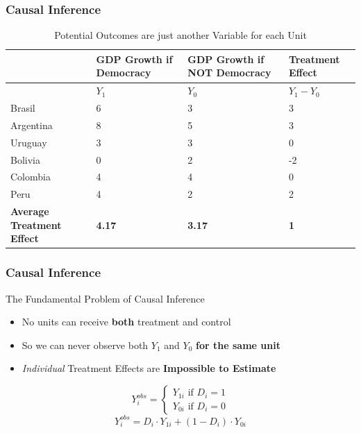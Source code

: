 \documentclass[xcolor=x11names,compress]{beamer}\usepackage[]{graphicx}\usepackage[]{xcolor}
\renewcommand{\(}{\begin{columns}}
\renewcommand{\)}{\end{columns}}
\newcommand{\<}[1]{\begin{column}{#1}}
\renewcommand{\>}{\end{column}}
\begin{document}
\begin{frame}
\frametitle{Causal Inference}
\footnotesize
\begin{table}[htbp]
  \centering
  \caption{Potential Outcomes are just another Variable for each Unit}
    \begin{tabular}{|p{2.4cm}|p{2.4cm}|p{2.4cm}|p{2.4cm}|}
    \hline
          & \multicolumn{1}{p{2.4cm}|}{GDP Growth if Democracy} & \multicolumn{1}{p{2.4cm}|}{GDP Growth if  NOT Democracy} & Treatment Effect \bigstrut\\
    \hline
          & \multicolumn{1}{p{2.4cm}|}{$Y_1$} & \multicolumn{1}{l|}{$Y_0$} & \multicolumn{1}{l|}{$Y_{1} - Y_{0}$} \bigstrut\\
    \hline
    Brasil & 6     & 3     & 3 \bigstrut\\
    \hline
    Argentina & 8    & 5     & 3 \bigstrut\\
    \hline
    Uruguay & 3 & 3 & 0  \bigstrut\\
    \hline
    Bolivia & 0     & 2     & -2 \bigstrut\\
    \hline
    Colombia & 4    & 4    & 0 \bigstrut\\
    \hline
    Peru & 4     & 2     & 2 \bigstrut\\
    \hline
    \textbf{Average Treatment Effect} & \textbf{4.17} & \textbf{3.17} & \textbf{1} \bigstrut\\
    \hline
    \end{tabular}%
  \label{tab:addlabel}%
\end{table}%
\normalsize
\end{frame}

\begin{frame}
\frametitle{Causal Inference}
\begin{block}{The Fundamental Problem of Causal Inference}
\begin{itemize}
\item No units can receive \textbf{both} treatment and control
\pause
\item So we can never observe both $Y_1$ and $Y_0$ \textbf{for the same unit}
\pause
\item \textit{Individual} Treatment Effects are \textbf{Impossible to Estimate}
\end{itemize}
\end{block}
\pause
\[
Y_{i}^{obs} = 
\begin{cases}
Y_{1i} \text{ if } D_i=1 \\
Y_{0i} \text{ if } D_i=0
\end{cases}
\]
\pause
$$Y_{i}^{obs} = D_i \cdot Y_{1i} + (1-D_i) \cdot Y_{0i}$$
\end{frame}
\end{document}
